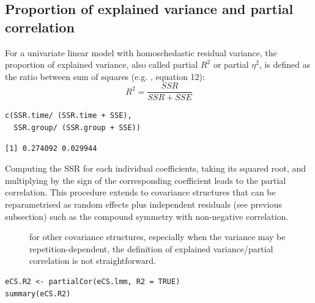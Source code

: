\documentclass[12pt]{article}
\newcommand\Warning[1][3ex]{%
\renewcommand\stacktype{L}%
\scaleto{\stackon[1.3pt]{\color{red}$\triangle$}{\tiny\bfseries !}}{#1}%
\xspace
}
\begin{document}
\subsection{Proportion of explained variance and partial correlation}
\label{sec:org02d4840}

For a univariate linear model with homoschedastic residual variance,
the proportion of explained variance, also called partial \(R^2\) or
partial \(\eta^2\), is defined as the ratio between sum of squares
(e.g. \cite{lakens2013calculating}, equation 12):
\[ R^2=\frac{SSR}{SSR + SSE} \]

\lstset{language=r,label= ,caption= ,captionpos=b,numbers=none}
\begin{lstlisting}
c(SSR.time/ (SSR.time + SSE),
  SSR.group/ (SSR.group + SSE))
\end{lstlisting}

\begin{verbatim}
[1] 0.274092 0.029944
\end{verbatim}


Computing the SSR for each individual coefficients, taking its squared
root, and multiplying by the sign of the corresponding coefficient
leads to the partial correlation. This procedure extends to covariance
structures that can be reparametrised as random effects plus
independent residuals (see previous subsection) such as the compound
symmetry with non-negative correlation.
\begin{description}
\item[{\Warning}] for other covariance structures, especially when the
variance may be repetition-dependent, the definition of explained
variance/partial correlation is not straightforward.
\end{description}
\lstset{language=r,label= ,caption= ,captionpos=b,numbers=none}
\begin{lstlisting}
eCS.R2 <- partialCor(eCS.lmm, R2 = TRUE)
summary(eCS.R2)
\end{lstlisting}
\end{document}
